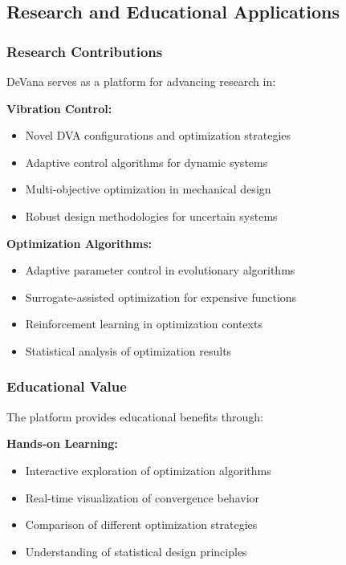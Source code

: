\documentclass[12pt,a4paper]{article}
\newcommand{\softwareName}{DeVana}
\begin{document}
\subsection{Research and Educational Applications}

\subsubsection{Research Contributions}

\softwareName{} serves as a platform for advancing research in:

\textbf{Vibration Control:}
\begin{itemize}
    \item Novel DVA configurations and optimization strategies
    \item Adaptive control algorithms for dynamic systems
    \item Multi-objective optimization in mechanical design
    \item Robust design methodologies for uncertain systems
\end{itemize}

\textbf{Optimization Algorithms:}
\begin{itemize}
    \item Adaptive parameter control in evolutionary algorithms
    \item Surrogate-assisted optimization for expensive functions
    \item Reinforcement learning in optimization contexts
    \item Statistical analysis of optimization results
\end{itemize}

\subsubsection{Educational Value}

The platform provides educational benefits through:

\textbf{Hands-on Learning:}
\begin{itemize}
    \item Interactive exploration of optimization algorithms
    \item Real-time visualization of convergence behavior
    \item Comparison of different optimization strategies
    \item Understanding of statistical design principles
\end{itemize}
\end{document}
